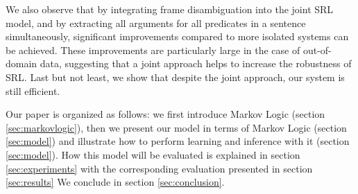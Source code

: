 
We also observe that by integrating frame disambiguation into the
joint SRL model, and by extracting all arguments for all predicates in a
sentence simultaneously, significant improvements compared to more isolated systems can be achieved. These improvements are particularly large in
the case of out-of-domain data, suggesting that a joint approach helps
to increase the robustness of SRL.
Last but not least, we show that despite the joint approach, our
system is still efficient. 

Our paper is organized as follows: we first introduce Markov Logic (section
\ref{sec:markovlogic}),
then we present our model in terms of Markov Logic (section \ref{sec:model}) and illustrate how to perform learning and inference with it (section \ref{sec:model}). How this model
will be evaluated is explained in section \ref{sec:experiments} with the corresponding
evaluation presented in section \ref{sec:results} We conclude in section
\ref{sec:conclusion}.


